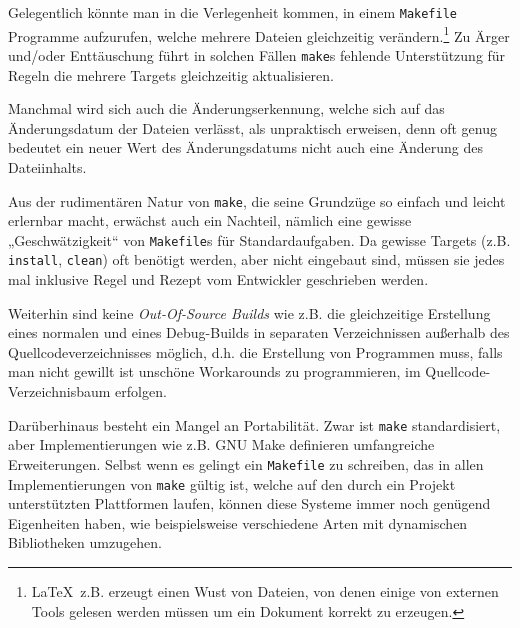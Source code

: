 Gelegentlich könnte man in die Verlegenheit kommen, in einem \texttt{Makefile}
Programme aufzurufen, welche mehrere Dateien gleichzeitig
verändern.\footnote{\LaTeX~z.B. erzeugt einen Wust von Dateien, von
denen einige von externen Tools gelesen werden müssen um ein Dokument korrekt zu
erzeugen.}%
Zu Ärger und/oder Enttäuschung führt in solchen Fällen \texttt{make}s fehlende
Unterstützung für Regeln die mehrere Targets gleichzeitig aktualisieren.

Manchmal wird sich auch die Änderungserkennung, welche sich auf das
Änderungsdatum der Dateien verlässt, als unpraktisch erweisen, denn oft genug
bedeutet ein neuer Wert des Änderungsdatums nicht auch eine Änderung des
Dateiinhalts. 

Aus der rudimentären Natur von \texttt{make}, die seine Grundzüge so einfach und
leicht erlernbar macht, erwächst auch ein Nachteil, nämlich eine gewisse
„Geschwätzigkeit“ von \texttt{Makefile}s für Standardaufgaben. Da gewisse
Targets (z.B. \texttt{install}, \texttt{clean})
 oft benötigt werden, aber nicht eingebaut
sind, müssen sie jedes mal inklusive Regel und Rezept vom Entwickler geschrieben
werden.

Weiterhin sind keine \emph{Out-Of-Source Builds} wie z.B. die gleichzeitige
Erstellung eines normalen und eines Debug-Builds in separaten Verzeichnissen
außerhalb des Quellcodeverzeichnisses möglich, d.h. die Erstellung
von Programmen muss, falls man nicht gewillt ist unschöne Workarounds zu
programmieren, im Quellcode-Verzeichnisbaum erfolgen.

Darüberhinaus besteht ein Mangel an Portabilität. Zwar ist \texttt{make}
standardisiert, aber Implementierungen wie z.B. GNU Make definieren umfangreiche
Erweiterungen.  
%
Selbst wenn es gelingt ein \texttt{Makefile} zu schreiben, das
in allen Implementierungen von \texttt{make} gültig ist, welche auf den durch
ein Projekt unterstützten Plattformen laufen, können diese Systeme immer noch
genügend Eigenheiten haben, wie beispielsweise verschiedene Arten mit
dynamischen Bibliotheken umzugehen.

